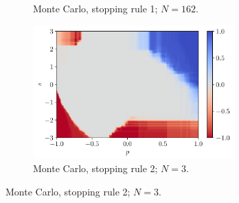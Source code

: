 \documentclass[a4paper, 12pt]{article}
\begin{document}
\begin{figure}[H]
\begin{subfigure}{0.49\textwidth}
            \caption{Monte Carlo, stopping rule 1; $N = 162$.}
        \end{subfigure}
        \hfill
        \begin{subfigure}{0.49\textwidth}
            \centering
            \includegraphics[width=0.85\textwidth]{resources/pdf/4_montecarlo_2_XRT_q_+4.pdf}
            \caption{Monte Carlo, stopping rule 2; $N = 3$.}
        \end{subfigure}
        \label{fig:qn.xrt.plus.4}
    \end{figure}
    
\end{document}
